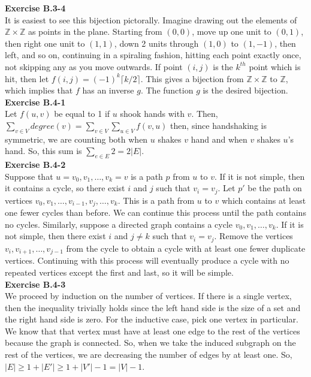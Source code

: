 \documentclass{article}
\begin{document}
\noindent\textbf{Exercise B.3-4}\\

It is easiest to see this bijection pictorally.  Imagine drawing out the elements of $\mathbb{Z} \times \mathbb{Z}$ as points in the plane.  Starting from $(0,0)$, move up one unit to $(0,1)$, then right one unit to $(1,1)$, down 2 units through $(1,0)$ to $(1,-1)$, then left, and so on, continuing in a spiraling fashion, hitting each point exactly once, not skipping any as you move outwards.  If point $(i,j)$ is the $k^{th}$ point which is hit, then let $f(i,j) = (-1)^k\lceil k/2 \rceil$.  This gives a bijection from $\mathbb{Z} \times \mathbb{Z}$ to $\mathbb{Z}$, which implies that $f$ has an inverse $g$.  The function $g$ is the desired bijection. \\

\noindent\textbf{Exercise B.4-1}\\
Let $f(u,v)$ be equal to 1 if $u$ shook hands with $v$. Then, $\sum_{v\in V} degree(v) = \sum_{v\in V} \sum_{u\in V} f(v,u)$ then, since handshaking is symmetric, we are counting both when $u$ shakes $v$ hand and when $v$ shakes $u$'s hand. So, this sum is $\sum_{e\in E} 2 = 2|E|$.\\

\noindent\textbf{Exercise B.4-2}\\

Suppose that $u = v_0, v_1, \ldots, v_k = v$ is a path $p$ from $u$ to $v$.  If it is not simple, then it contains a cycle, so there exist $i$ and $j$ such that $v_i = v_j$.  Let $p'$ be the path on vertices $v_0, v_1, \ldots, v_{i-1}, v_j, \ldots, v_k$.  This is a path from $u$ to $v$ which contains at least one fewer cycles than before.  We can continue this process until the path contains no cycles. Similarly, suppose a directed graph contains a cycle $v_0, v_1, \ldots, v_k$.  If it is not simple, then there exist $i$ and $j \neq k$ such that $v_i = v_j$.  Remove the vertices $v_i, v_{i+1}, \ldots, v_{j-1}$ from the cycle to obtain a cycle with at least one fewer duplicate vertices.  Continuing with this process will eventually produce a cycle with no repeated vertices except the first and last, so it will be simple. \\


\noindent\textbf{Exercise B.4-3}\\
We proceed by induction on the number of vertices. If there is a single vertex, then the inequality trivially holds since the left hand side is the size of a set and the right hand side is zero. For the inductive case, pick one vertex in particular. We know that that vertex must have at least one edge to the rest of the vertices because the graph is connected. So, when we take the induced subgraph on the rest of the vertices, we are decreasing the number of edges by at least one. So, $|E| \ge 1+ |E'| \ge 1+ |V'| -1 = |V| -1$.\\
\end{document}
